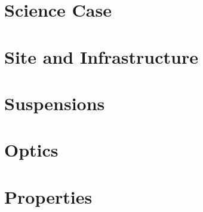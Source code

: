 \FloatBarrier
\begin{appendices}
\section{Science Case}\label{Science_Case_App}

\FloatBarrier
\section{Site and Infrastructure}\label{Site_and_Infra_App}

\FloatBarrier
\section{Suspensions}\label{Suspensions_App}

\FloatBarrier
\section{Optics}\label{Optics_App}

\FloatBarrier
\section{Properties}\label{sec:app}

\end{appendices}